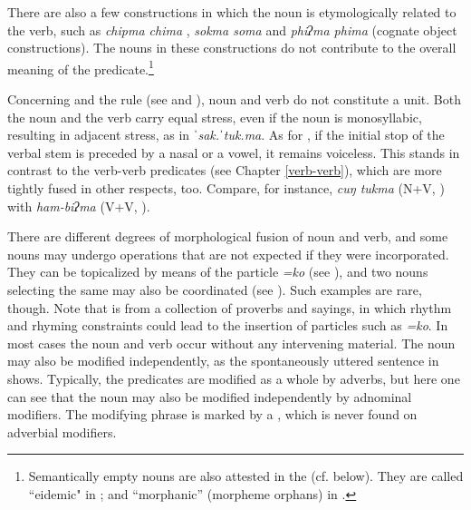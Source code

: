 There are also a few constructions in which the noun is etymologically related to the verb, such as  \emph{chipma chima} , \emph{sokma soma}  and \emph{phiʔma phima}  (cognate object constructions). The nouns in these constructions do  not contribute to the overall meaning of the predicate.\footnote{Semantically empty nouns are also attested in the  (cf. below). They are called “eidemic" in \citet{Bickel1995In-the-vestibule, Bickel1997The-possessive}; and “morphanic” (morpheme orphans) in  \citet{Matisoff1986Hearts}.} 

Concerning  and the  rule (see  and ), noun and verb do not constitute a unit. Both the noun and the verb carry equal stress, even if the noun is monosyllabic, resulting in adjacent stress, as in \emph{ˈsak.ˈtuk.ma}. As for , if the initial stop of the verbal stem is preceded by a nasal or a vowel, it remains voiceless. This stands in contrast to the verb-verb predicates (see Chapter \ref{verb-verb}), which are more tightly fused in other respects, too. Compare, for instance, \emph{cuŋ tukma}  (N+V, ) with  \emph{ham-biʔma}  (V+V, ). 

There are different degrees of morphological fusion of noun and verb, and some nouns may undergo operations that are not expected if they were incorporated. They can be topicalized by means of the particle \emph{=ko} (see \Next[a]), and two nouns selecting the same  may also be coordinated (see \Next[b]). Such examples are rare, though. Note that \Next[a] is from a collection of proverbs and sayings, in which rhythm and rhyming constraints could lead to the insertion of particles such as \emph{=ko}. In most cases the noun and verb occur without any intervening material. The noun may also be modified independently, as the spontaneously uttered sentence in \Next[c] shows. Typically, the predicates are modified as a whole by adverbs, but here one can see that the noun may also be modified independently by adnominal modifiers. The modifying phrase is marked by a , which is never found on adverbial modifiers.

